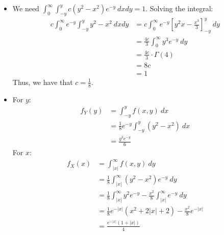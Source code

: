\documentclass[12pt]{article}
\begin{document}
\begin{itemize}
    \item [(a)]
          We need $\int^{\infty}_0\int_{-y}^{y} c(y^2-x^2)e^{-y} ~ dx dy = 1$. Solving the integral:
          \begin{align*}
              c\int^{\infty}_0 e^{-y} \int_{-y}^{y} y^2-x^2 ~ dx dy & = c\int^{\infty}_0 e^{-y} \left[y^2x - \frac{x^3}{3}\right]^y_{-y} ~dy \\
                                                                    & = \frac{4c}{3} \int^{\infty}_0 y^3 e^{-y} ~ dy                         \\
                                                                    & = \frac{4c}{3} \cdot \Gamma(4)                                         \\
                                                                    & = 8c                                                                   \\
                                                                    & = 1
          \end{align*}
          Thus, we have that $c= \frac{1}{8}$.
    \item [(b)]
          For $y$:
          \begin{align*}
              f_Y(y) & = \int^{y}_{-y} f(x,y) ~ dx                      \\
                     & = \frac{1}{8}e^{-y} \int^{y}_{-y} (y^2-x^2) ~ dx \\
                     & = \frac{y^3e^{-y} }{6}
          \end{align*}
          For $x$:
          \begin{align*}
              f_X(x) & = \int^{\infty}_{|x|} f(x,y) ~ dy                                                           \\
                     & = \frac{1}{8} \int^{\infty}_{|x|} (y^2-x^2)e^{-y} ~ dy                                      \\
                     & = \frac{1}{8} \int^{\infty}_{|x|} y^2e^{-y} - \frac{x^2}{8} \int^{\infty}_{|x|} e^{-y} ~ dy \\
                     & = \frac{1}{8} e^{-|x|}(x^2+2|x|+2) - \frac{x^2}{8} e^{-|x|}                                 \\
                     & = \frac{e^{-|x|}(1 + |x|)}{4}
          \end{align*}


\end{itemize}
\end{document}
